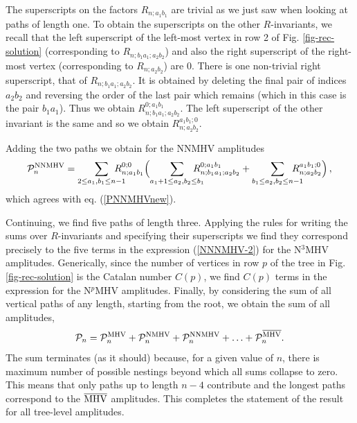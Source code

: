 \documentclass[12pt]{article}
\def \be  {\begin{equation}}
\def \ee  {\end{equation}}
\begin{document}
{The superscripts on the factors $R_{n;a_1b_1}$ are trivial as we just saw when looking at paths of length one.
To obtain the superscripts on the other $R$-invariants, we recall that the left superscript of the left-most vertex in row 2 of Fig. \ref{fig-rec-solution} (corresponding to $R_{n;b_1a_1;a_2b_2}$) and also the right superscript of the right-most vertex (corresponding to $R_{n;a_2b_2}$) are 0. There is one non-trivial right superscript, that of $R_{n;b_1a_1;a_2b_2}$. It is obtained by deleting the final pair of indices $a_2b_2$ and reversing the order of the last pair which remains (which in this case is the pair $b_1a_1$). Thus we obtain $R_{n;b_1a_1;a_2b_2}^{0;a_1b_1}$. The left superscript of the other invariant is the same and so we obtain $R_{n;a_2b_2}^{a_1b_1;0}$.

Adding the two paths we obtain for the NNMHV amplitudes
\be
\mathcal{P}_n^{\rm NNMHV} = \sum_{2 \leq a_1,b_1 \leq n-1} \!\!\!\!\!\!\!\! R_{n;a_1b_1}^{0;0} \Bigl( \sum_{a_1+1 \leq a_2,b_2 \leq b_1} \!\!\!\!\!\!\!\! R_{n;b_1a_1;a_2b_2}^{0;a_1b_1} + \sum_{b_1 \leq a_2,b_2 \leq n-1} \!\!\!\!\!\!\!\! R_{n;a_2b_2}^{a_1b_1;0} \Bigr)\,,
\ee
which agrees with eq. (\ref{PNNMHVnew}).

Continuing, we find five paths of length three. Applying the rules for writing the sums over $R$-invariants and specifying their superscripts we find they correspond precisely to the five terms in the expression (\ref{NNNMHV-2}) for the N${}^3$MHV amplitudes. Generically, since the number of vertices in row $p$ of the tree in Fig. \ref{fig-rec-solution} is the Catalan number $C(p)$, we find $C(p)$ terms in the expression for the N${}^p$MHV amplitudes. Finally, by considering the sum of all vertical paths of any length, starting from the root, we obtain the sum of all amplitudes,
\be
\mathcal{P}_n = \mathcal{P}_n^{\rm MHV} + \mathcal{P}_n^{\rm NMHV} + \mathcal{P}_n^{\rm NNMHV} + \ldots + \mathcal{P}_n^{\overline{\rm MHV}}.
\ee
The sum terminates (as it should) because, for a given value of $n$, there is maximum number of possible nestings beyond which all sums collapse to zero. This means that only paths up to length $n-4$ contribute and the longest paths correspond to the $\overline{\rm MHV}$ amplitudes.
This completes the statement of the result for all tree-level amplitudes.

}
\end{document}
